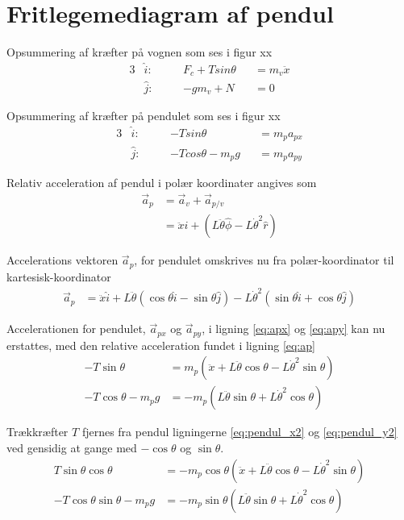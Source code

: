 \section{Fritlegemediagram af pendul}\label{sec:sec_fritlegemediagram}

Opsummering af kræfter på vognen som ses i figur xx
\begin{alignat}{3}
&\hat{i} : \quad && F_c + T sin{\theta} && = m_v \ddot{x} \label{eq:vogn_x}\\
&\hat{j} : \quad && -g m_v + N && = 0 
\end{alignat}

Opsummering af kræfter på pendulet som ses i figur xx
\begin{alignat}{3}
&\hat{i} : \quad &&-T sin{\theta} &&= m_p a_{px}\label{eq:apx}\\
&\hat{j} : \quad &&-T cos{\theta} - m_p g &&= m_p a_{py}\label{eq:apy} 
\end{alignat}

Relativ acceleration af pendul i polær koordinater angives som 
\begin{align}
\vec{a}_p &= \vec{a}_v + \vec{a}_{p/v} \nonumber \\
&= \ddot{x} \hat{i} + \left( L\ddot{\theta}\hat{\phi} - L\dot{\theta}^2\hat{r} \right)
\end{align}

Accelerations vektoren $\vec{a}_p$, for pendulet omskrives nu fra polær-koordinator til kartesisk-koordinator  
\begin{align}
\vec{a}_p &=  \ddot{x} \hat{i} 
				+ L\ddot{\theta} \left( \cos{\theta}\hat{i} - \sin{\theta}\hat{j} \right) 
				- L\dot{\theta}^2 \left( \sin{\theta}\hat{i} + \cos{\theta}\hat{j} \right) \label{eq:ap}
\end{align} 

Accelerationen for pendulet, $\vec{a}_{px}$ og $\vec{a}_{py}$, i ligning \ref{eq:apx} og \ref{eq:apy} kan nu erstattes, med den relative acceleration fundet i ligning \ref{eq:ap}
\begin{align}
-T\sin{\theta} &= m_p \left( \ddot{x} + L\ddot{\theta}\cos{\theta} - L\dot{\theta}^2\sin{\theta} \right)  \label{eq:pendul_x2}\\
-T\cos{\theta} - m_p g &=  -m_p \left( L\ddot{\theta}\sin{\theta} + L\dot{\theta}^2\cos{\theta}  \right) \label{eq:pendul_y2}
\end{align} 

Trækkræfter $T$ fjernes fra pendul ligningerne \ref{eq:pendul_x2} og \ref{eq:pendul_y2} ved gensidig at gange med $-\cos{\theta}$ og $\sin{\theta}$. 
\begin{align}
T\sin{\theta}\cos{\theta} &=   -m_p \cos{\theta} \left( \ddot{x} + L\ddot{\theta}\cos{\theta} - L\dot{\theta}^2\sin{\theta} \right) \label{eq:pendul_x3} \\
-T\cos{\theta}\sin{\theta} - m_p g &=  -m_p \sin{\theta} \left( L\ddot{\theta}\sin{\theta} + L\dot{\theta}^2\cos{\theta}\right) \label{eq:pendul_y3}
\end{align}

